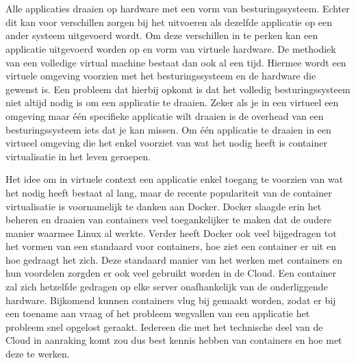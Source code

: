 
\chapter{}
\label{ch:inleiding}

Alle applicaties draaien op hardware met een vorm van besturingssysteem. Echter dit kan voor verschillen zorgen bij het uitvoeren als dezelfde applicatie op een ander systeem uitgevoerd wordt. Om deze verschillen in te perken kan een applicatie uitgevoerd worden op en vorm van virtuele hardware. De methodiek van een volledige virtual machine bestaat dan ook al een tijd. Hiermee wordt een virtuele omgeving voorzien met het besturingssysteem en de hardware die gewenst is. Een probleem dat hierbij opkomt is dat het volledig besturingssysteem niet altijd nodig is om een applicatie te draaien.  Zeker als je in een virtueel een omgeving maar één specifieke applicatie wilt draaien is de overhead van een besturingssysteem iets dat je kan missen.  Om één applicatie te draaien in een virtueel omgeving die het enkel voorziet van wat het nodig heeft is container virtualisatie in het leven geroepen.
 
Het idee om in virtuele context een applicatie enkel toegang te voorzien van wat het nodig heeft bestaat al lang, maar de recente populariteit van de container virtualisatie is voornamelijk te danken aan Docker. Docker slaagde erin het beheren en draaien van containers veel toegankelijker te maken dat de oudere manier waarmee Linux al werkte.  Verder heeft Docker ook veel bijgedragen tot het vormen van een standaard voor containers, hoe ziet een container er uit en hoe gedraagt het zich. Deze standaard manier van het werken met containers en hun voordelen zorgden er ook veel gebruikt worden in de Cloud. Een container zal zich hetzelfde gedragen op elke server onafhankelijk van de onderliggende hardware. Bijkomend kunnen containers vlug bij gemaakt worden, zodat er bij een toename aan vraag of het probleem wegvallen van een applicatie het probleem snel opgelost geraakt. Iedereen die met het technische deel van de Cloud in aanraking komt zou dus best kennis hebben van containers en hoe met deze te werken.


\section{}
\label{sec:probleemstelling}

